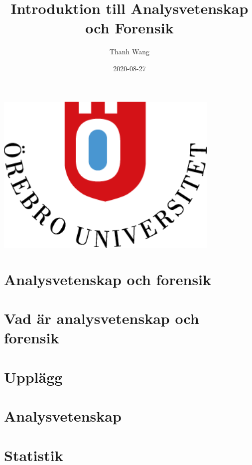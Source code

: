 \documentclass[
]{book}
\title{Introduktion till Analysvetenskap och Forensik}
\author{Thanh Wang}
\date{2020-08-27}
\begin{document}
\maketitle

{
\setcounter{tocdepth}{1}
\tableofcontents
}
\includegraphics[width=4.24in]{images/logotype305x220}

\hypertarget{analysvetenskap-och-forensik}{%
\chapter{Analysvetenskap och forensik}\label{analysvetenskap-och-forensik}}

\hypertarget{intro}{%
\chapter{Vad är analysvetenskap och forensik}\label{intro}}

\hypertarget{upplagg}{%
\chapter{Upplägg}\label{upplagg}}

\hypertarget{analysvetenskap}{%
\chapter{Analysvetenskap}\label{analysvetenskap}}

\hypertarget{statistik}{%
\chapter{Statistik}\label{statistik}}
\end{document}
